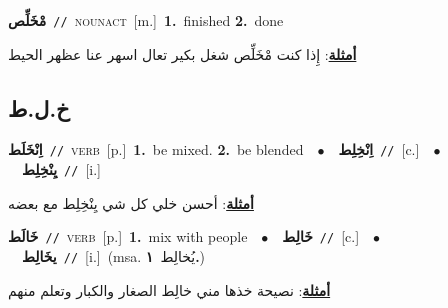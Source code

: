 \documentclass[10pt,a4paper,twoside]{article} %
\begin{document}
\begin{multicols}{2}
{\setlength\topsep{0pt}\textbf{\foreignlanguage{arabic}{مْخَلِّص}}\ {\color{gray}\texttt{//}\color{black}}\ \textsc{noun\textunderscore act}\ [m.]\ \textbf{1.}~finished  \textbf{2.}~done\  \begin{flushright}\color{gray}\foreignlanguage{arabic}{\textbf{\underline{\foreignlanguage{arabic}{أمثلة}}}: إِذا كنت مْخَلِّص شغل بكير تعال اسهر عنا عظهر الحيط}\end{flushright}\color{black}} \vspace{2mm}

\vspace{-3mm}
\subsection*{\color{blue}\foreignlanguage{arabic}{خ.ل.ط}\color{blue}{}} 

{\setlength\topsep{0pt}\textbf{\foreignlanguage{arabic}{اِنْخَلَط}}\ {\color{gray}\texttt{//}\color{black}}\ \textsc{verb}\ [p.]\ \textbf{1.}~be mixed.  \textbf{2.}~be blended\ \ $\bullet$\ \ \setlength\topsep{0pt}\textbf{\foreignlanguage{arabic}{اِنْخِلِط}}\ {\color{gray}\texttt{//}\color{black}}\ [c.]\ \ $\bullet$\ \ \setlength\topsep{0pt}\textbf{\foreignlanguage{arabic}{يِنْخِلِط}}\ {\color{gray}\texttt{//}\color{black}}\ [i.]\  \begin{flushright}\color{gray}\foreignlanguage{arabic}{\textbf{\underline{\foreignlanguage{arabic}{أمثلة}}}: أحسن خلي كل شي يِنْخِلِط مع بعضه}\end{flushright}\color{black}} \vspace{2mm}

{\setlength\topsep{0pt}\textbf{\foreignlanguage{arabic}{خَالَط}}\ {\color{gray}\texttt{//}\color{black}}\ \textsc{verb}\ [p.]\ \textbf{1.}~mix with people\ \ $\bullet$\ \ \setlength\topsep{0pt}\textbf{\foreignlanguage{arabic}{خَالِط}}\ {\color{gray}\texttt{//}\color{black}}\ [c.]\ \ $\bullet$\ \ \setlength\topsep{0pt}\textbf{\foreignlanguage{arabic}{يخَالِط}}\ {\color{gray}\texttt{//}\color{black}}\ [i.]\ \color{gray}(msa. \foreignlanguage{arabic}{يُخالِط}~\foreignlanguage{arabic}{\textbf{١.}})\color{black}\  \begin{flushright}\color{gray}\foreignlanguage{arabic}{\textbf{\underline{\foreignlanguage{arabic}{أمثلة}}}: نصيحة خذها مني خالِط الصغار والكبار وتعلم منهم}\end{flushright}\color{black}} \vspace{2mm}


\end{multicols}
\end{document}
